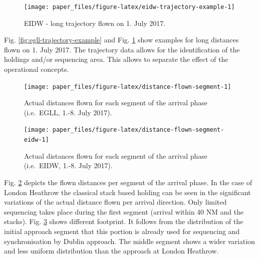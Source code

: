 \documentclass[conference,final,a4paper,]{IEEEtran}
\begin{document}
\begin{figure}[H]

{\centering \texttt{[image: paper\_files/figure-latex/eidw-trajectory-example-1]} 

}

\caption{EIDW - long trajectory flown on 1. July
2017.}\label{fig:eidw-trajectory-example}
\end{figure}

Fig. \ref{fig:egll-trajectory-example} and Fig.
\ref{fig:eidw-trajectory-example} show examples for long distances flown
on 1. July 2017. The trajectory data allows for the identification of
the holdings and/or sequencing area. This allows to separate the effect
of the operational concepts.




\begin{figure}[H]

{\centering \texttt{[image: paper\_files/figure-latex/distance-flown-segment-1]} 

}

\caption{Actual distances flown for each segment of
the arrival phase (i.e.~EGLL, 1.-8. July 2017).}\label{fig:distance-flown-segment}
\end{figure}




\begin{figure}[H]

{\centering \texttt{[image: paper\_files/figure-latex/distance-flown-segment-eidw-1]} 

}

\caption{Actual distances flown for each
segment of the arrival phase (i.e.~EIDW, 1.-8. July 2017).}\label{fig:distance-flown-segment-eidw}
\end{figure}

Fig. \ref{fig:distance-flown-segment} depicts the flown distances per
segment of the arrival phase. In the case of London Heathrow the
classical stack based holding can be seen in the significant variations
of the actual distance flown per arrival direction. Only limited
sequencing takes place during the first segment (arrival within 40 NM
and the stacks). Fig. \ref{fig:distance-flown-segment-eidw} shows
different footprint. It follows from the distribution of the initial
approach segment that this portion is already used for sequencing and
synchronisation by Dublin approach. The middle segment shows a wider
variation and less uniform distribution than the approach at London
Heathrow.
\end{document}
